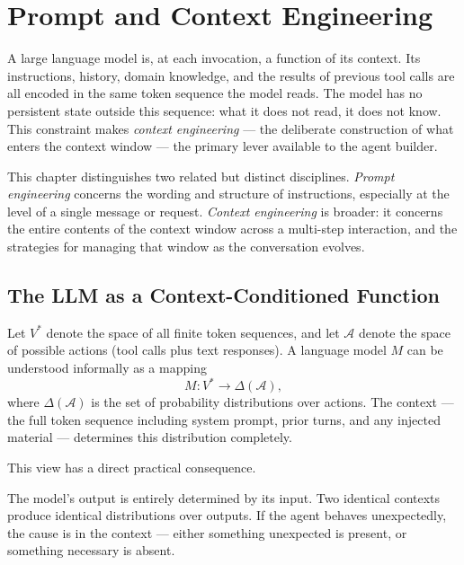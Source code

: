 \chapter{Prompt and Context Engineering}
\label{chapter:ContextEngineering}

A large language model is, at each invocation, a function of its context.
Its instructions, history, domain knowledge, and the results of previous tool calls are all encoded in the same token sequence the model reads.
The model has no persistent state outside this sequence: what it does not read, it does not know.
This constraint makes \emph{context engineering} — the deliberate construction of what enters the context window — the primary lever available to the agent builder.

This chapter distinguishes two related but distinct disciplines.
\emph{Prompt engineering} concerns the wording and structure of instructions, especially at the level of a single message or request.
\emph{Context engineering} is broader: it concerns the entire contents of the context window across a multi-step interaction, and the strategies for managing that window as the conversation evolves.

\section{The LLM as a Context-Conditioned Function}
\label{section:LLMContextFunction}

Let $V^*$ denote the space of all finite token sequences, and let $\mathcal{A}$ denote the space of possible actions (tool calls plus text responses).
A language model $M$ can be understood informally as a mapping
\begin{equation}
M : V^* \to \Delta(\mathcal{A}) ,
\label{equation:ModelAsFunction}
\end{equation}
where $\Delta(\mathcal{A})$ is the set of probability distributions over actions.
The context — the full token sequence including system prompt, prior turns, and any injected material — determines this distribution completely.

This view has a direct practical consequence.

\begin{principle}
\label{principle:ContextDeterminesOutput}
The model's output is entirely determined by its input.
Two identical contexts produce identical distributions over outputs.
If the agent behaves unexpectedly, the cause is in the context — either something unexpected is present, or something necessary is absent.
\end{principle}

